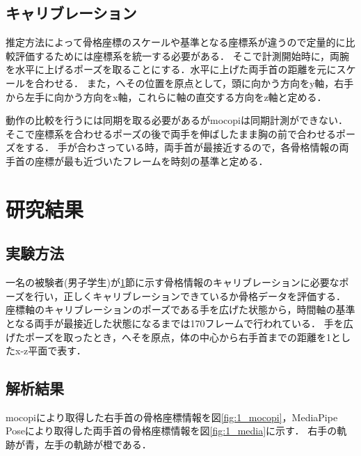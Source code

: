 \documentclass[a4j, fleqn, 12pt]{jsreport}
\begin{document}
\section{キャリブレーション}\label{kyari}
推定方法によって骨格座標のスケールや基準となる座標系が違うので定量的に比較評価するためには座標系を統一する必要がある．
そこで計測開始時に，両腕を水平に上げるポーズを取ることにする．水平に上げた両手首の距離を元にスケールを合わせる．
また，へその位置を原点として，頭に向かう方向をy軸，右手から左手に向かう方向をx軸，これらに軸の直交する方向をz軸と定める．

動作の比較を行うには同期を取る必要があるがmocopiは同期計測ができない．
そこで座標系を合わせるポーズの後で両手を伸ばしたまま胸の前で合わせるポーズをする．
手が合わさっている時，両手首が最接近するので，各骨格情報の両手首の座標が最も近づいたフレームを時刻の基準と定める．

\chapter{研究結果}
\section{実験方法}
一名の被験者(男子学生)が\ref{kyari}節に示す骨格情報のキャリブレーションに必要なポーズを行い，正しくキャリブレーションできているか骨格データを評価する．
座標軸のキャリブレーションのポーズである手を広げた状態から，時間軸の基準となる両手が最接近した状態になるまでは170フレームで行われている．
手を広げたポーズを取ったとき，へそを原点，体の中心から右手首までの距離を1としたx-z平面で表す．
\section{解析結果}
mocopiにより取得した右手首の骨格座標情報を図\ref{fig:1_mocopi}，MediaPipe Poseにより取得した両手首の骨格座標情報を図\ref{fig:1_media}に示す．
右手の軌跡が青，左手の軌跡が橙である．
\end{document}
